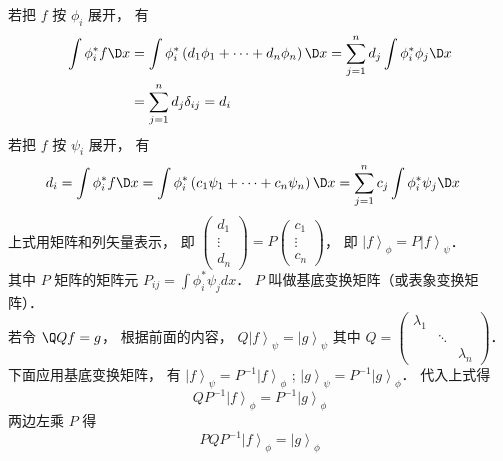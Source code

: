 若把 $f$ 按 ${\phi_i}$ 展开， 有
\begin{equation}
\begin{aligned}
\int {\phi_i^*f   \D x} & = \int {\phi_i^*\left( {{d_1}{\phi_1} + \dots + {d_n}{\phi_n}} \right)   \D x}  = \sum\limits_{j = 1}^n {{d_j}} \int {\phi_i^*{\phi_j} \D x}  \\
&= \sum\limits_{j = 1}^n {{d_j}} {\delta_{ij}} = {d_i}
\end{aligned}
\end{equation}
若把 $f$ 按 $\psi_i$ 展开， 有
\begin{equation}
\begin{aligned}
{d_i} & = \int {\phi_i^*f   \D x}   = \int {\phi_i^*\left( {{c_1}{\psi_1} + \dots + {c_n}{\psi_n}} \right)   \D x} = \sum\limits_{j = 1}^n {{c_j}} \int {\phi_i^*{\psi_j} \D x}
\end{aligned}
\end{equation}
上式用矩阵和列矢量表示， 即 $\left( {\begin{aligned}
{{d_1}}\\
 \vdots \\
{{d_n}}
\end{aligned}} \right) = P\left( {\begin{aligned}
{{c_1}}\\
 \vdots \\
{{c_n}}
\end{aligned}} \right)$，  即 ${\left| f \right\rangle_\phi } = P{\left| f \right\rangle_\psi }$．\\
其中 $P$ 矩阵的矩阵元 ${P_{ij}} = \int {\phi_i^*{\psi_j}dx} $．  $P$ 叫做基底变换矩阵（或表象变换矩阵）．\\
若令 $\Q Q f = g$，  根据前面的内容， $Q{\left| f \right\rangle_\psi } = {\left| g \right\rangle_\psi }$ 其中 $Q = \left( {\begin{aligned}
{{\lambda_1}}&{}&{}\\
{}& \ddots &{}\\
{}&{}&{{\lambda_n}}
\end{aligned}} \right)$． \\
下面应用基底变换矩阵， 有 ${\left| f \right\rangle_\psi } = {P^{ - 1}}{\left| f \right\rangle_\phi }$ ; ${\left| g \right\rangle_\psi } = {P^{ - 1}}{\left| g \right\rangle_\phi }$． 代入上式得
\begin{equation}
  Q{P^{ - 1}}{\left| f \right\rangle_\phi } = {P^{ - 1}}{\left| g \right\rangle_\phi }
\end{equation}
两边左乘 $P$ 得
\begin{equation}
  PQ{P^{ - 1}}{\left| f \right\rangle_\phi } = {\left| g \right\rangle_\phi }
\end{equation}
